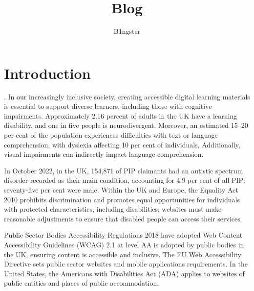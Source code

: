 \documentclass{article}
\title{Blog}
\author{B1ngster}
\date{}
\begin{document}
   \begin{titlepage}
    \begin{adjustwidth}{-1in}{-1in} %
        \vskip2cm
        \noindent %
        \vfill
        \vfill
    \end{adjustwidth}
\end{titlepage}



\newpage
\tableofcontents
\newpage


\section{Introduction}
. 
In our increasingly inclusive society, creating accessible digital learning materials is essential to support diverse learners, including those with cognitive impairments. Approximately 2.16 percent of adults in the UK have a learning disability, and one in five people is neurodivergent. Moreover, an estimated 15–20 per cent of the population experiences difficulties with text or language comprehension, with dyslexia affecting 10 per cent of individuals. Additionally, visual impairments can indirectly impact language comprehension.

In October 2022, in the UK,  154,871 of PIP claimants had an autistic spectrum disorder recorded as their main condition, accounting for 4.9 per cent of all PIP; seventy-five per cent were male. Within the UK and Europe, the Equality Act 2010 prohibits discrimination and promotes equal opportunities for individuals with protected characteristics, including disabilities; websites must make reasonable adjustments to ensure that disabled people can access their services. 

Public Sector Bodies Accessibility Regulations 2018 have adopted Web Content Accessibility Guidelines (WCAG) 2.1 at level AA is adopted by public bodies in the UK, ensuring content is accessible and inclusive. The EU Web Accessibility Directive sets public sector websites and mobile applications requirements. In the United States, the Americans with Disabilities Act (ADA) applies to websites of public entities and places of public accommodation. 
\end{document}
